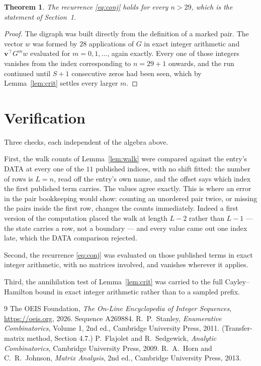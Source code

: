 \documentclass[11pt,a4paper]{article}
\theoremstyle{plain}
\newtheorem{theorem}{Theorem}
\theoremstyle{definition}
\begin{document}
\begin{theorem}
The recurrence \eqref{eq:conj} holds for every $n>29$, which is the statement of
Section~1.
\end{theorem}

\begin{proof}
The digraph was built directly from the definition of a marked pair. The vector $w$ was
formed by $28$ applications of $G$ in exact integer arithmetic and
$\mathbf{v}^{\!\top}G^{m}w$ evaluated for $m=0,1,\dots$, again exactly. Every one of
those integers vanishes from the index corresponding to $n=29+1$ onwards, and the run
continued until $S+1$ consecutive zeros had been seen, which by Lemma~\ref{lem:crit}
settles every larger $m$.
\end{proof}

\section{Verification}

Three checks, each independent of the algebra above.

First, the walk counts of Lemma~\ref{lem:walk} were compared against the entry's DATA at
every one of the $11$ published indices, with no shift fitted: the number of rows is
$L=n$, read off the entry's own name, and the offset says which index the first
published term carries. The values agree exactly. This is where an error in the pair
bookkeeping would show: counting an unordered pair twice, or missing the pairs inside the
first row, changes the counts immediately. Indeed a first version of the computation
placed the walk at length $L-2$ rather than $L-1$ --- the state carries a row, not a
boundary --- and every value came out one index late, which the DATA comparison rejected.

Second, the recurrence \eqref{eq:conj} was evaluated on those published terms in exact
integer arithmetic, with no matrices involved, and vanishes wherever it applies.

Third, the annihilation test of Lemma~\ref{lem:crit} was carried to the full
Cayley--Hamilton bound in exact integer arithmetic rather than to a sampled prefix.

\begin{thebibliography}{9}
 The OEIS Foundation, \emph{The On-Line Encyclopedia of Integer
Sequences}, \url{https://oeis.org}, 2026. Sequence A269884.
 R.~P.~Stanley, \emph{Enumerative Combinatorics}, Volume 1, 2nd ed.,
Cambridge University Press, 2011. (Transfer-matrix method, Section 4.7.)
 P.~Flajolet and R.~Sedgewick, \emph{Analytic Combinatorics}, Cambridge
University Press, 2009.
 R.~A.~Horn and C.~R.~Johnson, \emph{Matrix Analysis}, 2nd ed., Cambridge
University Press, 2013.
\end{thebibliography}
\end{document}
